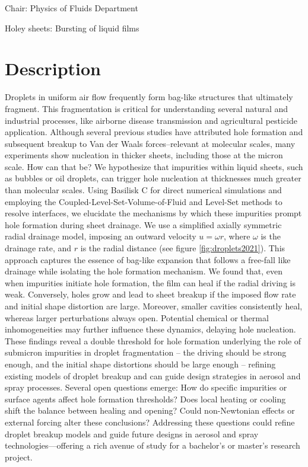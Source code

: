 \documentclass[a4paper,10pt]{article}
\begin{document}
 
\thispagestyle{empty} %

\noindent Chair: Physics of Fluids Department
\begin{center}
 \begin{LARGE}
 Holey sheets: Bursting of liquid films
 \end{LARGE}
\end{center}

\section*{Description}

Droplets in uniform air flow frequently form bag-like structures that ultimately fragment. This fragmentation is critical for understanding several natural and industrial processes, like airborne disease transmission and agricultural pesticide application. 
Although several previous studies have attributed hole formation and subsequent breakup to Van der Waals forces--relevant at molecular scales, many experiments show nucleation in thicker sheets, including those at the micron scale. How can that be? We hypothesize that impurities within liquid sheets, such as bubbles or oil droplets, can trigger hole nucleation at thicknesses much greater than molecular scales. 
Using Basilisk C for direct numerical simulations and employing the Coupled-Level-Set-Volume-of-Fluid and Level-Set methods to resolve interfaces, we elucidate the mechanisms by which these impurities prompt hole formation during sheet drainage. 
We use a simplified axially symmetric radial drainage model, imposing an outward velocity $u = \omega r$, where $\omega$ is the drainage rate, and $r$ is the radial distance (see figure \ref{fig:droplets2021}). This approach captures the essence of bag-like expansion that follows a free-fall like drainage while isolating the hole formation mechanism.
We found that, even when impurities initiate hole formation, the film can heal if the radial driving is weak. Conversely, holes grow and lead to sheet breakup if the imposed flow rate and initial shape distortion are large.
Moreover, smaller cavities consistently heal, whereas larger perturbations always open. Potential chemical or thermal inhomogeneities may further influence these dynamics, delaying hole nucleation. These findings reveal a double threshold for hole formation underlying the role of submicron impurities in droplet fragmentation -- the driving should be strong enough, and the initial shape distortions should be large enough -- refining existing models of droplet breakup and can guide design strategies in aerosol and spray processes.
Several open questions emerge: How do specific impurities or surface agents affect hole formation thresholds? Does local heating or cooling shift the balance between healing and opening? Could non-Newtonian effects or external forcing alter these conclusions? Addressing these questions could refine droplet breakup models and guide future designs in aerosol and spray technologies—offering a rich avenue of study for a bachelor's or master's research project.
\end{document}
